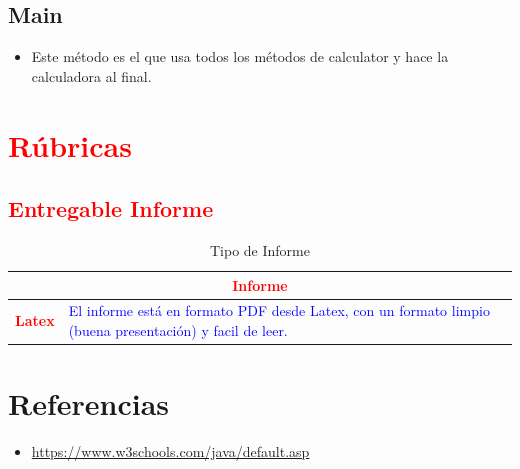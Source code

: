 \documentclass{article}
\begin{document}
	\subsection{Main}
	
	\begin{itemize}
		\item Este método es el que usa todos los métodos de calculator y hace la calculadora al final.
	\end{itemize}
	\section{\textcolor{red}{Rúbricas}}
	
	\subsection{\textcolor{red}{Entregable Informe}}
	\begin{table}[H]
		\caption{Tipo de Informe}
		\setlength{\tabcolsep}{0.5em} %
		{\renewcommand{\arraystretch}{1.5}%
		\begin{tabular}{|p{3cm}|p{12cm}|}
			\hline
			\multicolumn{2}{|c|}{\textbf{\textcolor{red}{Informe}}}  \\
			\hline 
			\textbf{\textcolor{red}{Latex}} & \textcolor{blue}{El informe está en formato PDF desde Latex,  con un formato limpio (buena presentación) y facil de leer.}   \\ 
			\hline 
			
			
		\end{tabular}
	}
	\end{table}
	
	\clearpage
\section{Referencias}
\begin{itemize}			
	\item \url{https://www.w3schools.com/java/default.asp}
\end{itemize}	
	
%
%
%
			
\end{document}
